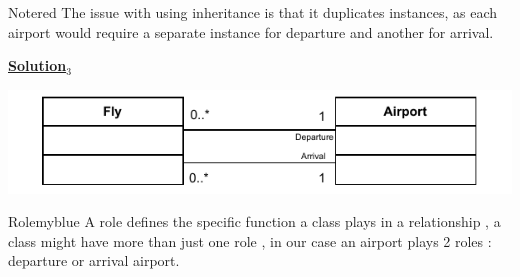 \begin{prettyBox}{Note}{red}
The issue with using inheritance is that it duplicates instances, as each airport would require
a separate instance for departure and another for arrival.  
\end{prettyBox}

\vspace{1cm}
\Large{\textbf{\underline{Solution\(_3\)}}}

\begin{center}
    \includegraphics[height=0.12\textheight]{Exercices/EX1/ex1.3.drawio.pdf}
\end{center}

\vspace{0.5cm}

\begin{prettyBox}{Role}{myblue}
A role defines the specific function a class plays in a relationship , a class might have more
than just one role , in our case an airport plays 2 roles : departure or arrival airport.  
\end{prettyBox}

